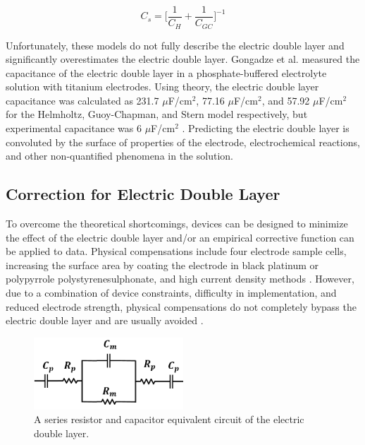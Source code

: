 \begin{equation}
    C_s = \bigg[ \frac{1}{C_H} + \frac{1}{C_{GC}}\bigg]^{-1}
\end{equation}

\par Unfortunately, these models do not fully describe the electric double layer and significantly overestimates the electric double layer. Gongadze et al. measured the capacitance of the electric double layer in a phosphate-buffered electrolyte solution with titanium electrodes. Using theory, the electric double layer capacitance was calculated as 231.7 $\mu$F/cm$^2$, 77.16 $\mu$F/cm$^2$, and 57.92 $\mu$F/cm$^2$ for the Helmholtz, Guoy-Chapman, and Stern model respectively, but experimental capacitance was 6 $\mu$F/cm$^2$ \cite{_gongadze.pdf_????}. Predicting the electric double layer is convoluted by the surface of properties of the electrode, electrochemical reactions, and other non-quantified phenomena in the solution. 

\subsection{Correction for Electric Double Layer}

\par To overcome the theoretical shortcomings, devices can be designed to minimize the effect of the electric double layer and/or an empirical corrective function can be applied to data. Physical compensations include four electrode sample cells, increasing the surface area by coating the electrode in black platinum or polypyrrole polystyrenesulphonate, and high current density methods \cite{ishai_electrode_2013}. However, due to a combination of device constraints, difficulty in implementation, and reduced electrode strength, physical compensations do not completely bypass the electric double layer and are usually avoided \cite{ishai_assessment_2012}. 

\begin{figure}
    \centering
    \includegraphics[width=0.5\textwidth]{images/edl_cap_equiv.png}
    \caption{A series resistor and capacitor equivalent circuit of the electric double layer.}
    \label{fig:edl_cap_equiv}
\end{figure}


